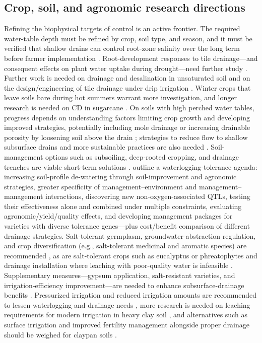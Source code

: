 \documentclass[11pt]{article}
\begin{document}
\subsection{Crop, soil, and agronomic research directions}
Refining the biophysical targets of control is an active frontier. The required water-table depth must be refined by crop, soil type, and season, and it must be verified that shallow drains can control root-zone salinity over the long term before farmer implementation \parencite{Christen2001b}. Root-development responses to tile drainage---and consequent effects on plant water uptake during drought---need further study \parencite{Nash2015b}. Further work is needed on drainage and desalination in unsaturated soil and on the design/engineering of tile drainage under drip irrigation \parencite{Chen2021}. Winter crops that leave soils bare during hot summers warrant more investigation, and longer research is needed on CD in sugarcane \parencite{Akram2013}. On soils with high perched water tables, progress depends on understanding factors limiting crop growth and developing improved strategies, potentially including mole drainage or increasing drainable porosity by loosening soil above the drain \parencite{Muirhead1996}; strategies to reduce flow to shallow subsurface drains and more sustainable practices are also needed \parencite{Muirhead1996}. Soil-management options such as subsoiling, deep-rooted cropping, and drainage trenches are viable short-term solutions \parencite{Guedessou2021}. \textcite{Manik2019} outline a waterlogging-tolerance agenda: increasing soil-profile de-watering through soil-improvement and agronomic strategies, greater specificity of management--environment and management--management interactions, discovering new non-oxygen-associated QTLs, testing their effectiveness alone and combined under multiple constraints, evaluating agronomic/yield/quality effects, and developing management packages for varieties with diverse tolerance genes---plus cost/benefit comparison of different drainage strategies. Salt-tolerant germplasm, groundwater-abstraction regulation, and crop diversification (e.g., salt-tolerant medicinal and aromatic species) are recommended \parencite{Qureshi2008}, as are salt-tolerant crops such as eucalyptus or phreatophytes and drainage installation where leaching with poor-quality water is infeasible \parencite{Sarwar2001}. Supplementary measures---gypsum application, salt-resistant varieties, and irrigation-efficiency improvement---are needed to enhance subsurface-drainage benefits \parencite{Ritzema2008b}. Pressurized irrigation and reduced irrigation amounts are recommended to lessen waterlogging and drainage needs \parencite{Khorramian2022}, more research is needed on leaching requirements for modern irrigation in heavy clay soil \parencite{Mahmoud2021}, and alternatives such as surface irrigation and improved fertility management alongside proper drainage should be weighed for claypan soils \parencite{MOSTAGHIMI1989}.
\end{document}
